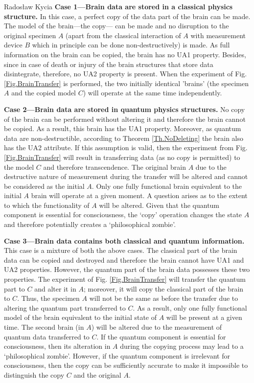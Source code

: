\begin{artengenv}{Radosław Kycia}
\textbf{Case 1---Brain data are stored in a classical physics structure.} In this case, a perfect copy of the data part of the brain can be made. The model of the brain---the copy--- can be made and no disruption to the original specimen $A$ (apart from the classical interaction of $A$ with measurement device $B$ which in principle can be done non-destructively) is made. As full information on the brain can be copied, the brain has no UA1 property. Besides, since in case of death or injury of the brain structures that store data disintegrate, therefore, no UA2 property is present. When the experiment of Fig. \ref{Fig.BrainTransfer} is performed, the two initially identical 'brains' (the specimen $A$ and the copied model $C$) will operate at the same time independently.


\textbf{Case 2---Brain data are stored in quantum physics structures.} No copy of the brain can be performed without altering it and therefore the brain cannot be copied. As a result, this brain has the UA1 property. Moreover, as quantum data are non-destructible, according to Theorem \ref{Th.NoDeleting} the brain also has the UA2 attribute. If this assumption is valid, then the experiment from Fig. \ref{Fig.BrainTransfer} will result in transferring data (as no copy is permitted) to the model $C$ and therefore transcendence. The original brain $A$ due to the destructive nature of measurement during the transfer will be altered and cannot be considered as the initial $A$. Only one fully functional brain equivalent to the initial $A$ brain will operate at a given moment. A question arises as to the extent to which the functionality of $A$ will be altered. Given that the quantum component is essential for consciousness, the `copy' operation changes the state $A$ and therefore potentially creates a `philosophical zombie'.


\textbf{Case 3---Brain data contains both classical and quantum information.} This case is a mixture of both the above cases. The classical part of the brain data can be copied and destroyed and therefore the brain cannot have UA1 and UA2 properties. However, the quantum part of the brain data possesses these two properties. The experiment of Fig. \ref{Fig.BrainTransfer} will transfer the quantum part to $C$ and alter it in $A$; moreover, it will copy the classical part of the brain to $C$. Thus, the specimen $A$ will not be the same as before the transfer due to altering the quantum part transferred to $C$. As a result, only one fully functional model of the brain equivalent to the initial state of $A$ will be present at a given time. The second brain (in $A$) will be altered due to the measurement of quantum data transferred to $C$. If the quantum component is essential for consciousness, then its alteration in $A$ during the copying process may lead to a `philosophical zombie'. However, if the quantum component is irrelevant for consciousness, then the copy can be sufficiently accurate to make it impossible to distinguish the copy $C$ and the original $A$.


\end{artengenv}
